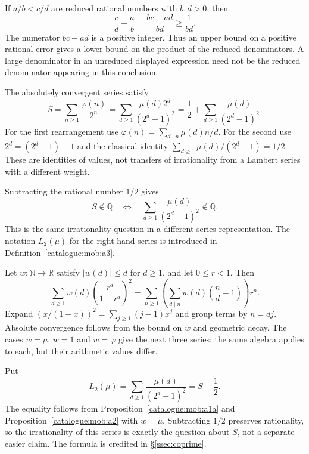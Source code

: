 \begin{prop}\label{catalogue:cert:d9}
If $a/b<c/d$ are reduced rational numbers with $b,d>0$, then
\[
 \frac cd-\frac ab=\frac{bc-ad}{bd}\ge\frac1{bd}.
\]
The numerator $bc-ad$ is a positive integer. Thus an upper bound on a
positive rational error gives a lower bound on the product of the reduced
denominators. A large denominator in an unreduced displayed expression
need not be the reduced denominator appearing in this conclusion.
\end{prop}

\begin{prop}\label{catalogue:mob:a1a}
The absolutely convergent series satisfy
\[
 S=\sum_{n\ge1}\frac{\varphi(n)}{2^n}
  =\sum_{d\ge1}\frac{\mu(d)2^d}{(2^d-1)^2}
  =\frac12+\sum_{d\ge1}\frac{\mu(d)}{(2^d-1)^2}.
\]
For the first rearrangement use
$\varphi(n)=\sum_{d\mid n}\mu(d)n/d$. For the second use
$2^d=(2^d-1)+1$ and the classical identity
$\sum_{d\ge1}\mu(d)/(2^d-1)=1/2$.
These are identities of values, not transfers of irrationality from a
Lambert series with a different weight.
\end{prop}

\begin{cor}\label{catalogue:mob:a1b}
Subtracting the rational number $1/2$ gives
\[
 S\notin\mathbb Q
 \quad\Longleftrightarrow\quad
 \sum_{d\ge1}\frac{\mu(d)}{(2^d-1)^2}\notin\mathbb Q.
\]
This is the same irrationality question in a different series
representation. The notation $L_2(\mu)$ for the right-hand series is
introduced in Definition~\ref{catalogue:mob:a3}.
\end{cor}

\begin{prop}\label{catalogue:mob:a2}
Let $w:\mathbb N\to\mathbb R$ satisfy $|w(d)|\le d$ for $d\ge1$,
and let $0\le r<1$. Then
\[
 \sum_{d\ge1}w(d)\left(\frac{r^d}{1-r^d}\right)^2
 =\sum_{n\ge1}\left(\sum_{d\mid n}w(d)\left(\frac nd-1\right)\right)r^n.
\]
Expand $(x/(1-x))^2=\sum_{j\ge1}(j-1)x^j$ and group terms by
$n=dj$. Absolute convergence follows from the bound on $w$ and
geometric decay. The cases $w=\mu$, $w=1$ and $w=\varphi$ give the next
three series; the same algebra applies to each, but their arithmetic
values differ.
\end{prop}

\begin{defn}\label{catalogue:mob:a3}
Put
\[
 L_2(\mu)=\sum_{d\ge1}\frac{\mu(d)}{(2^d-1)^2}=S-\frac12.
\]
The equality follows from Proposition~\ref{catalogue:mob:a1a} and
Proposition~\ref{catalogue:mob:a2} with $w=\mu$.
Subtracting $1/2$ preserves rationality, so the irrationality of this
series is exactly the question about $S$, not a separate easier claim.
The formula is credited in \S\ref{ssec:coprime}.
\end{defn}

